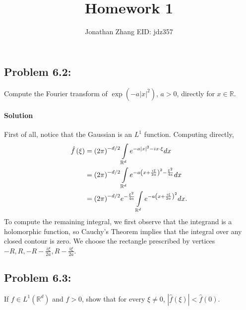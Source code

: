 \documentclass[letterpaper,twoside,11pt]{article}
\theoremstyle{mystyle}
\newcommand{\R}{{\mathbb R}}
\begin{document}
\title{\vspace{-2\baselineskip} 
Homework 1
}
\author{Jonathan Zhang \qquad EID: { jdz357} }
\date{}
\maketitle


\subsection*{Problem 6.2:}
Compute the Fourier transform of $\exp\left( -a| x| ^2 \right)$, $a>0$, directly for $x\in \R$. 

\paragraph*{Solution} 
First of all, notice that the Gaussian is an $L^1$ function. 
Computing directly,
\begin{align*}
    \hat f\left( \xi  \right) &= {\left( {2\pi } \right)^{ - d/2}}\int\limits_{{\mathbb{R}^d}} {{e^{ - a{{\left| x \right|}^2} - ix \cdot \xi }}dx}  \hfill \\
     &= {\left( {2\pi } \right)^{ - d/2}}\int\limits_{{\mathbb{R}^d}} {{e^{ - a{{\left( {x + \frac{{i\xi }}{{2a}}} \right)}^2} - \frac{{{\xi ^2}}}{{4a}}}}dx}  \hfill \\
     &= {\left( {2\pi } \right)^{ - d/2}}{e^{ - \frac{{{\xi ^2}}}{{4a}}}}\int\limits_{{\mathbb{R}^d}} {{e^{ - a{{\left( {x + \frac{{i\xi }}{{2a}}} \right)}^2}}}dx}.  
\end{align*}
To compute the remaining integral, we first observe that the integrand is a holomorphic function, so Cauchy's Theorem implies that the integral over any closed contour is zero. We choose the rectangle prescribed by vertices $-R, R, -R-\frac{i\xi}{2a},R-\frac{i\xi}{2a}$.  



\subsection*{Problem 6.3:}
If $f\in L^1\left( \R^d \right)$ and $f>0$, show that for every $\xi\neq 0$, $\left\vert \hat f \left( \xi \right) \right\vert< \hat f\left( 0 \right)$. 
\end{document}

